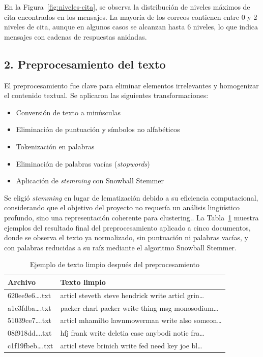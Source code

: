 \documentclass[journal]{IEEEtran}
\begin{document}
En la Figura~\ref{fig:niveles-cita}, se observa la distribución de niveles máximos de cita encontrados en los mensajes. La mayoría de los correos contienen entre 0 y 2 niveles de cita, aunque en algunos casos se alcanzan hasta 6 niveles, lo que indica mensajes con cadenas de respuestas anidadas.

\subsection*{2. Preprocesamiento del texto}
El preprocesamiento fue clave para eliminar elementos irrelevantes y homogenizar el contenido textual. Se aplicaron las siguientes transformaciones:
\begin{itemize}
    \item Conversión de texto a minúsculas
    \item Eliminación de puntuación y símbolos no alfabéticos
    \item Tokenización en palabras
    \item Eliminación de palabras vacías (\textit{stopwords})
    \item Aplicación de \textit{stemming} con Snowball Stemmer
\end{itemize}

\vspace{12pt}
Se eligió \textit{stemming} en lugar de lematización debido a su eficiencia computacional, considerando que el objetivo del proyecto no requería un análisis lingüístico profundo, sino una representación coherente para clustering.. La Tabla~\ref{tab:texto-limpio} muestra ejemplos del resultado final del preprocesamiento aplicado a cinco documentos, donde se observa el texto ya normalizado, sin puntuación ni palabras vacías, y con palabras reducidas a su raíz mediante el algoritmo Snowball Stemmer.

\begin{table}[H]
\centering
\caption{Ejemplo de texto limpio después del preprocesamiento}
\label{tab:texto-limpio}
\begin{tabular}{|l|p{6cm}|}
\hline
\textbf{Archivo} & \textbf{Texto limpio} \\
\hline
620ee9e6\ldots.txt & articl steveth steve hendrick write articl grin\ldots \\
a1c3fdba\ldots.txt & packer charl packer write thing msg monosodium\ldots \\
51039ce7\ldots.txt & articl mhamilto lawnmowerman write also someon\ldots \\
08f918dd\ldots.txt & hfj frank write deletia case anybodi notic fra\ldots \\
c1f19fbeb\ldots.txt & articl steve brinich write fed need key joe bl\ldots \\
\hline
\end{tabular}
\end{table}
\end{document}
